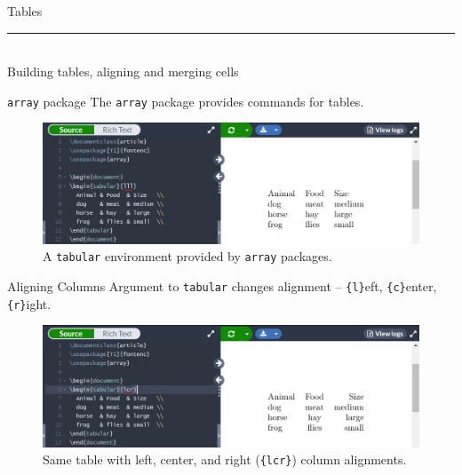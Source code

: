 \documentclass{beamer}
\begin{document}
{  \begin{frame}[plain]
    \vfill
    \centering
    \begin{beamercolorbox}[sep=8pt,center,shadow=true,rounded=true]{Tables}
      \insertsectionhead\par%
      \color{davisblue}\noindent\rule{10cm}{1pt} \\
      \footnotesize{Building tables, aligning and merging cells}
    \end{beamercolorbox}
    \vfill
  \end{frame}

  \begin{frame}{\texttt{array} package}
    The \texttt{array} package provides commands for tables.
    \begin{figure}
      \includegraphics[width=0.9\linewidth]{day01-overleaf-11A-table.png}
      \caption{A \texttt{tabular} environment provided by \texttt{array} packages.}
      \label{fig:day01-overleaf-11A}
    \end{figure}
  \end{frame}

  \begin{frame}{Aligning Columns}
    Argument to \texttt{tabular} changes alignment -- \texttt{\{l\}}eft, \texttt{\{c\}}enter, \texttt{\{r\}}ight.
    \begin{figure}
      \includegraphics[width=0.9\linewidth]{day01-overleaf-11B-table-align.png}
      \caption{Same table with left, center, and right (\texttt{\{lcr\}}) column alignments.}
      \label{fig:day01-overleaf-11B}
    \end{figure}
  \end{frame}

}
\end{document}
